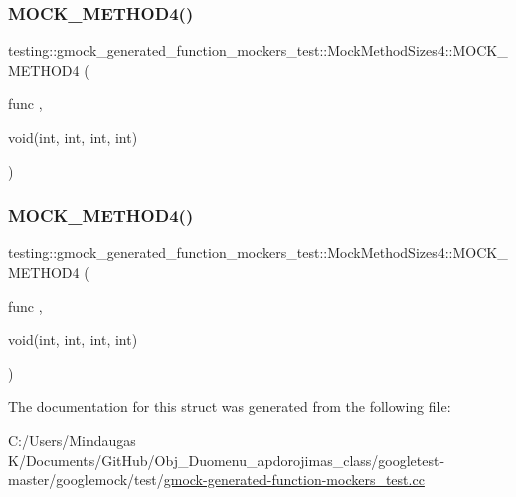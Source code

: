 \mbox{\label{structtesting_1_1gmock__generated__function__mockers__test_1_1_mock_method_sizes4_a140f1bc5124d32b763913f5f64fe3502}} 
\subsubsection{\texorpdfstring{MOCK\_METHOD4()}{MOCK\_METHOD4()}\hspace{0.1cm}{\footnotesize\ttfamily [2/3]}}
{\footnotesize\ttfamily testing\+::gmock\+\_\+generated\+\_\+function\+\_\+mockers\+\_\+test\+::\+Mock\+Method\+Sizes4\+::\+M\+O\+C\+K\+\_\+\+M\+E\+T\+H\+O\+D4 (\begin{DoxyParamCaption}\item[{func}]{,  }\item[{void(int, int, int, int)}]{ }\end{DoxyParamCaption})}

\mbox{\label{structtesting_1_1gmock__generated__function__mockers__test_1_1_mock_method_sizes4_a140f1bc5124d32b763913f5f64fe3502}} 
\subsubsection{\texorpdfstring{MOCK\_METHOD4()}{MOCK\_METHOD4()}\hspace{0.1cm}{\footnotesize\ttfamily [3/3]}}
{\footnotesize\ttfamily testing\+::gmock\+\_\+generated\+\_\+function\+\_\+mockers\+\_\+test\+::\+Mock\+Method\+Sizes4\+::\+M\+O\+C\+K\+\_\+\+M\+E\+T\+H\+O\+D4 (\begin{DoxyParamCaption}\item[{func}]{,  }\item[{void(int, int, int, int)}]{ }\end{DoxyParamCaption})}



The documentation for this struct was generated from the following file\+:\begin{DoxyCompactItemize}
\item 
C\+:/\+Users/\+Mindaugas K/\+Documents/\+Git\+Hub/\+Obj\+\_\+\+Duomenu\+\_\+apdorojimas\+\_\+class/googletest-\/master/googlemock/test/\mbox{\hyperlink{googletest-master_2googlemock_2test_2gmock-generated-function-mockers__test_8cc}{gmock-\/generated-\/function-\/mockers\+\_\+test.\+cc}}\end{DoxyCompactItemize}
